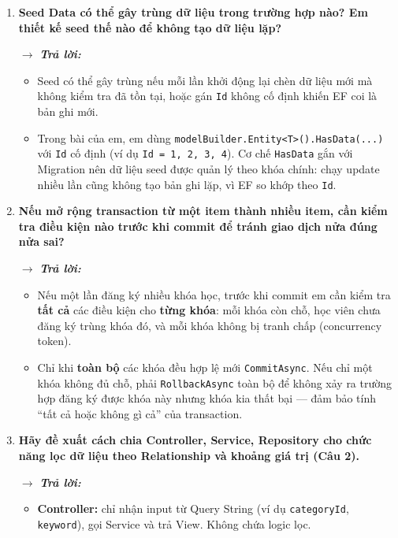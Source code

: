 \begin{enumerate}[label = \arabic*.]
    \item \textbf{Seed Data có thể gây trùng dữ liệu trong trường hợp nào? Em thiết kế seed thế nào để không tạo dữ liệu lặp?}

    $\rightarrow$ \textbf{\textit{Trả lời:}}
    \begin{itemize}[leftmargin = 0.6cm, label = -]
        \item Seed có thể gây trùng nếu mỗi lần khởi động lại chèn dữ liệu mới mà không kiểm tra đã tồn tại, hoặc gán \texttt{Id} không cố định khiến EF coi là bản ghi mới.

        \item Trong bài của em, em dùng \texttt{modelBuilder.Entity<T>().HasData(...)} với \texttt{Id} cố định (ví dụ \texttt{Id = 1, 2, 3, 4}). Cơ chế \texttt{HasData} gắn với Migration nên dữ liệu seed được quản lý theo khóa chính: chạy update nhiều lần cũng không tạo bản ghi lặp, vì EF so khớp theo \texttt{Id}.
    \end{itemize}

    \item \textbf{Nếu mở rộng transaction từ một item thành nhiều item, cần kiểm tra điều kiện nào trước khi commit để tránh giao dịch nửa đúng nửa sai?}

    $\rightarrow$ \textbf{\textit{Trả lời:}}
    \begin{itemize}[leftmargin = 0.6cm, label = -]
        \item Nếu một lần đăng ký nhiều khóa học, trước khi commit em cần kiểm tra \textbf{tất cả} các điều kiện cho \textbf{từng khóa}: mỗi khóa còn chỗ, học viên chưa đăng ký trùng khóa đó, và mỗi khóa không bị tranh chấp (concurrency token).

        \item Chỉ khi \textbf{toàn bộ} các khóa đều hợp lệ mới \texttt{CommitAsync}. Nếu chỉ một khóa không đủ chỗ, phải \texttt{RollbackAsync} toàn bộ để không xảy ra trường hợp đăng ký được khóa này nhưng khóa kia thất bại --- đảm bảo tính ``tất cả hoặc không gì cả'' của transaction.
    \end{itemize}

    \item \textbf{Hãy đề xuất cách chia Controller, Service, Repository cho chức năng lọc dữ liệu theo Relationship và khoảng giá trị (Câu 2).}

    $\rightarrow$ \textbf{\textit{Trả lời:}}
    \begin{itemize}[leftmargin = 0.6cm, label = -]
        \item \textbf{Controller:} chỉ nhận input từ Query String (ví dụ \texttt{categoryId}, \texttt{keyword}), gọi Service và trả View. Không chứa logic lọc.


\end{itemize}
\end{enumerate}
